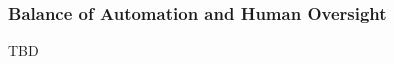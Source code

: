 





\subsubsection{Balance of Automation and Human Oversight} %
\label{sec:Balance of Automation and Human Oversight}

TBD






